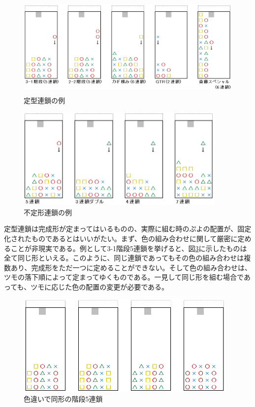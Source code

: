 \documentclass[12pt]{jreport}
\begin{document}
\begin{figure}[tbp]
  \begin{center}
  \includegraphics[height=5cm]{img/teikei.png}
  \caption{定型連鎖の例} \label{fig:teikei}
\end{center}
\end{figure}

\begin{figure}[tbp]
  \begin{center}
  \includegraphics[height=5cm]{img/huteikei.png}
  \caption{不定形連鎖の例} \label{fig:huteikei}
\end{center}
\end{figure}

定型連鎖は完成形が定まってはいるものの、実際に組む時のぷよの配置が、固定化されたものであるとはいいがたい。まず、色の組み合わせに関して厳密に定めることが非現実である。例として3-1階段5連鎖を挙げると、図\ref{fig:kaidan5}に示したものは全て同じ形といえる。このように、同じ連鎖であってもその色の組み合わせは複数あり、完成形をただ一つに定めることができない。そして色の組み合わせは、ツモの落下順によって定まってゆくものである。一見して同じ形を組む場合であっても、ツモに応じた色の配置の変更が必要である。

\begin{figure}[tbp]
  \begin{center}
  \includegraphics[height=5cm]{img/kaidan5.png}
  \caption{色違いで同形の階段5連鎖} \label{fig:kaidan5}
\end{center}
\end{figure}
\end{document}
